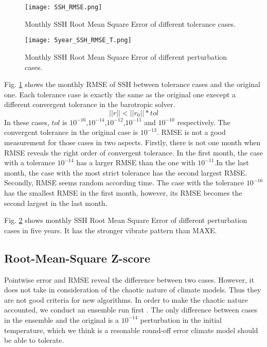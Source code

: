\documentclass{sig-alternate}
\begin{document}
\begin{figure}
\begin{center}
\texttt{[image: SSH\_RMSE.png]}
\end{center}
\caption[] {Monthly SSH Root Mean Square Error of different tolerance cases.}
\label{fig:ssh_rmse_t}
\end{figure}

\begin{figure}
\begin{center}
\texttt{[image: 5year\_SSH\_RMSE\_T.png]}
\end{center}
\caption[] {Monthly SSH Root Mean Square Error of different perturbation cases.}
\label{fig:5year_ssh_rmse_t}
\end{figure}


Fig. \ref{fig:ssh_rmse_t} shows the monthly RMSE of SSH between tolerance cases and the original one. Each tolerance case is exactly the same as the original one execept a different convergent tolerance in the barotropic solver. 
$$||r|| < ||r_0||*tol$$
In these cases, $tol$ is $10^{-16}$,$10^{-14}$,$10^{-12}$,$10^{-11}$ and $10^{-10}$ respectively. The convergent tolerance in the original case is $10^{-13}$.
RMSE is not a good measurement for those cases in two aspects. Firstly, there is not one month when RMSE reveals the right order of convergent tolerance. In the first month, the case with a tolerance $10^{-14}$ has a larger RMSE than the one with $10^{-11}$.In the last month, the case with the most strict tolerance has the second largest RMSE. Secondly, RMSE seems random according time. The case with the tolerance $10^{-16}$ has the smallest RMSE in the first month, however, its RMSE becomes the second largest in the last month.

Fig. \ref{fig:5year_ssh_rmse_t} shows monthly SSH Root Mean Square Error of different perturbation cases in five years. It has the stronger vibrate pattern than MAXE. 

\subsection{Root-Mean-Square Z-score}


Pointwise error and RMSE reveal the difference between two cases. However, it does not take in consideration of the chaotic nature of climate models. Thus they are not good criteria for new algorithms. In order to make the chaotic nature accounted, we conduct an ensemble run first \cite{baker2014methodology}. The only difference between cases in the ensemble and the original is a $10^{-14}$ perturbation in the initial temperature, which we think is a resonable round-off error climate model should be able to tolerate. \\
\end{document}
